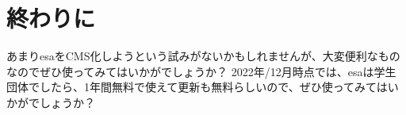 \chapter{終わりに}
あまりesaをCMS化しようという試みがないかもしれませんが、大変便利なものなのでぜひ使ってみてはいかがでしょうか？
2022年/12月時点では、esaは学生団体でしたら、1年間無料で使えて更新も無料らしいので、ぜひ使ってみてはいかがでしょうか？